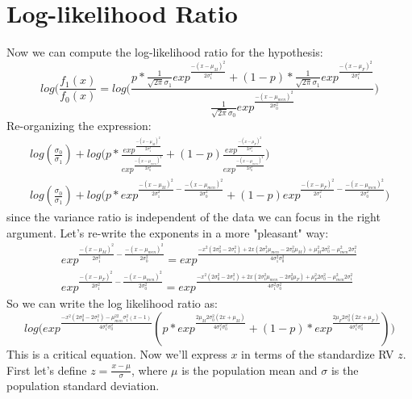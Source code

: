 \documentclass[12pt]{article}
\begin{document}
\section{Log-likelihood Ratio}
Now we can compute the log-likelihood ratio for the hypothesis:
\begin{equation}
log(\frac{f_1(x)}{f_0(x)} = log\big(\frac{p*\frac{1}{\sqrt{2\pi}\sigma_1}exp^{\frac{-(x - \mu_{M})^2}{2\sigma_1^2}} + (1-p)*\frac{1}{\sqrt{2\pi}\sigma_1}exp^{\frac{-(x - \mu_{F})^2}{2\sigma_1^2}}}{\frac{1}{\sqrt{2\pi}\sigma_0}exp^{\frac{-(x - \mu_{men})^2}{2\sigma_0^2}}}\big)
\end{equation}
Re-organizing the expression:
\begin{gather*}
log (\frac{\sigma_0}{\sigma_1}) + 
log\big(
p* \frac{exp^{\frac{-(x - \mu_{M})^2}{2\sigma_1^2}}}{exp^{\frac{-(x - \mu_{men})^2}{2\sigma_0^2}}} + (1-p)\frac{exp^{\frac{-(x - \mu_{F})^2}{2\sigma_1^2}}}{exp^{\frac{-(x - \mu_{men})^2}{2\sigma_0^2}}} \big) \\
log (\frac{\sigma_0}{\sigma_1}) + 
log\big(
p * exp^{\frac{-(x - \mu_{M})^2}{2\sigma_1^2} - \frac{-(x - \mu_{men})^2}{2\sigma_0^2}} + (1-p)exp^{\frac{-(x - \mu_{F})^2}{2\sigma_1^2} - \frac{-(x - \mu_{men})^2}{2\sigma_0^2}}\big)
\end{gather*}
since the variance ratio is independent of the data we can focus in the right argument. Let's re-write the exponents in a more "pleasant" way:  
\begin{gather*}
exp^{\frac{-(x - \mu_{M})^2}{2\sigma_1^2} - \frac{-(x - \mu_{men})^2}{2\sigma_0^2}} = exp^{\frac{-x^2(2\sigma_0^2 - 2\sigma_1^2) + 2x(2\sigma_1^2\mu_{men} - 2\sigma_0^2\mu_M)+\mu^2_M 2\sigma_0^2 - \mu^2_{men} 2\sigma_1^2}{4\sigma_1^2\sigma_0^2}} \\
exp^{\frac{-(x - \mu_{F})^2}{2\sigma_1^2} - \frac{-(x - \mu_{men})^2}{2\sigma_0^2}} = exp^{\frac{-x^2(2\sigma_0^2 - 2\sigma_1^2) + 2x(2\sigma_1^2\mu_{men} - 2\sigma_0^2\mu_F)+\mu^2_F 2\sigma_0^2 - \mu^2_{men} 2\sigma_1^2}{4\sigma_1^2\sigma_0^2}}
\end{gather*}
So we can write the log likelihood ratio as:
\begin{equation}
log\big(exp^{\frac{-x^2(2\sigma^2_0 - 2\sigma^2_1) - \mu_{men}^22\sigma^2_1(x-1)}{4\sigma^2_1\sigma^2_0}}(p*exp^{\frac{2\mu_M2\sigma_0^2(2x + \mu_M)}{4\sigma^2_1\sigma^2_0}} + (1-p)*exp^{\frac{2\mu_F2\sigma_0^2(2x + \mu_F)}{4\sigma^2_1\sigma^2_0}}) \big)
\end{equation}
This is a critical equation. Now we'll express $x$ in terms of the standardize RV $z$. First let's define $z = \frac{x - \mu}{\sigma}$, where $\mu$ is the population mean and $\sigma$ is the population standard deviation.
\end{document}
